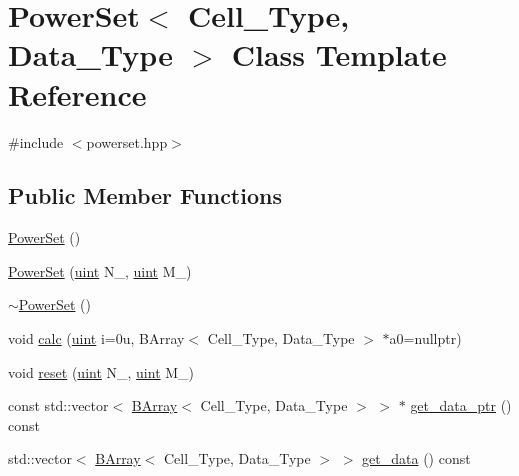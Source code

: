 \hypertarget{class_power_set}{}\section{Power\+Set$<$ Cell\+\_\+\+Type, Data\+\_\+\+Type $>$ Class Template Reference}
\label{class_power_set}


{\ttfamily \#include $<$powerset.\+hpp$>$}

\subsection*{Public Member Functions}
\begin{DoxyCompactItemize}
\item 
\hyperlink{class_power_set_a3eacd45a7ed035773020df7d1db154c0}{Power\+Set} ()
\item 
\hyperlink{class_power_set_a2b1a73cd0b9a1dbab0a139d32d4e8b8d}{Power\+Set} (\hyperlink{typedefs_8hpp_a91ad9478d81a7aaf2593e8d9c3d06a14}{uint} N\+\_\+, \hyperlink{typedefs_8hpp_a91ad9478d81a7aaf2593e8d9c3d06a14}{uint} M\+\_\+)
\item 
\hyperlink{class_power_set_a6736bc9d8a2a57669f3531ecb429c42f}{$\sim$\+Power\+Set} ()
\item 
void \hyperlink{class_power_set_a93e31ba8891642db6ecf0fca82c71f6a}{calc} (\hyperlink{typedefs_8hpp_a91ad9478d81a7aaf2593e8d9c3d06a14}{uint} i=0u, B\+Array$<$ Cell\+\_\+\+Type, Data\+\_\+\+Type $>$ $\ast$a0=nullptr)
\item 
void \hyperlink{class_power_set_a8074f5a6d44b6b7f6bad56d15576eb9f}{reset} (\hyperlink{typedefs_8hpp_a91ad9478d81a7aaf2593e8d9c3d06a14}{uint} N\+\_\+, \hyperlink{typedefs_8hpp_a91ad9478d81a7aaf2593e8d9c3d06a14}{uint} M\+\_\+)
\item 
const std\+::vector$<$ \hyperlink{class_b_array}{B\+Array}$<$ Cell\+\_\+\+Type, Data\+\_\+\+Type $>$ $>$ $\ast$ \hyperlink{class_power_set_a1ff9c2195a8d83b60813b38f5143693f}{get\+\_\+data\+\_\+ptr} () const
\item 
std\+::vector$<$ \hyperlink{class_b_array}{B\+Array}$<$ Cell\+\_\+\+Type, Data\+\_\+\+Type $>$ $>$ \hyperlink{class_power_set_aa1700af475e219c59a5969a89a0d80d3}{get\+\_\+data} () const
\end{DoxyCompactItemize}
